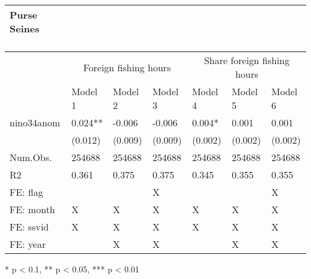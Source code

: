 \captionsetup[table]{labelformat=empty,skip=1pt}
\begin{longtable}{lllllll}
\caption*{
\large Purse Seines\\ 
\small \\ 
} \\ 
\toprule
& \multicolumn{3}{c}{Foreign fishing hours} & \multicolumn{3}{c}{Share foreign fishing hours} \\ 
 \cmidrule(lr){2-4}\cmidrule(lr){5-7}
  & Model 1 & Model 2 & Model 3 & Model 4 & Model 5 & Model 6 \\ 
\midrule
nino34anom & 0.024** & -0.006 & -0.006 & 0.004* & 0.001 & 0.001 \\ 
 & (0.012) & (0.009) & (0.009) & (0.002) & (0.002) & (0.002) \\ 
Num.Obs. & 254688 & 254688 & 254688 & 254688 & 254688 & 254688 \\ 
R2 & 0.361 & 0.375 & 0.375 & 0.345 & 0.355 & 0.355 \\ 
FE:  flag &  &  & X &  &  & X \\ 
FE:  month & X & X & X & X & X & X \\ 
FE:  ssvid & X & X & X & X & X & X \\ 
FE:  year &  & X & X &  & X & X \\ 
\bottomrule
\end{longtable}
\begin{minipage}{\linewidth}
* p < 0.1, ** p < 0.05, *** p < 0.01\\ 
\end{minipage}

